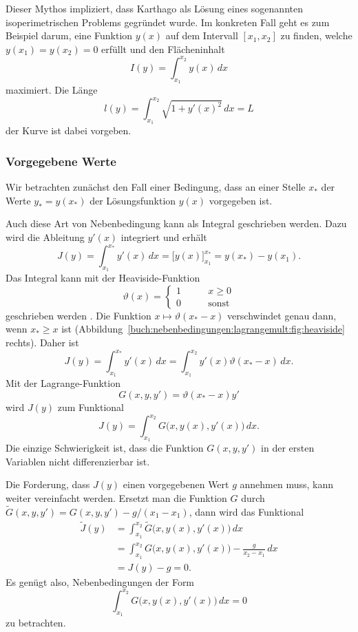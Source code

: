 Dieser Mythos impliziert, dass Karthago als Lösung eines sogenannten
isoperimetrischen Problems gegründet wurde.
%
Im konkreten Fall geht es zum Beispiel darum, eine Funktion $y(x)$
auf dem Intervall $[x_1,x_2]$ zu finden, welche $y(x_1)=y(x_2)=0$
erfüllt und den Flächeninhalt
\[
I(y)
=
\int_{x_1}^{x_2} y(x)\,dx
\]
maximiert.
Die Länge
\[
l(y)
=
\int_{x_1}^{x_2}
\sqrt{1+y'(x)^2}
\,dx
=
L
\]
der Kurve ist dabei vorgeben.

%
%
\subsubsection{Vorgegebene Werte}
Wir betrachten zunächst den Fall einer Bedingung, dass an einer Stelle
$x_*$ der Werte $y_*=y(x_*)$ der Lösungsfunktion $y(x)$ vorgegeben ist.

Auch diese Art von Nebenbedingung kann als Integral geschrieben werden.
Dazu wird die Ableitung $y'(x)$ integriert und erhält
\[
J(y)
=
\int_{x_1}^{x_*} y'(x)\,dx
=
\biggl[y(x)\biggr]_{x_1}^{x_*}
=
y(x_*)-y(x_1).
\]
Das Integral kann mit der Heaviside-Funktion
\begin{equation}
\vartheta(x)
=
\begin{cases}
1&\qquad x\ge 0\\
0&\qquad\text{sonst}
\end{cases}
\label{buch:nebenbedingungen:lagrangemult:eqn:heaviside}
\end{equation}
geschrieben werden%
.
Die Funktion $x\mapsto\vartheta(x_*-x)$ verschwindet genau dann,
wenn $x_*\ge x$ ist
(Abbildung~\ref{buch:nebenbedingungen:lagrangemult:fig:heaviside} rechts).
Daher ist
\[
J(y)
=
\int_{x_1}^{x_*} y'(x)\,dx
=
\int_{x_1}^{x_2} y'(x)\vartheta(x_*-x)\,dx.
\]
Mit der Lagrange-Funktion
\begin{equation}
G(x,y,y')
=
\vartheta(x_*-x)
y'
\label{buch:nebenbedingungen:lagrangemult:eqn:heavilagrange}
\end{equation}
wird $J(y)$ zum Funktional
\[
J(y)
=
\int_{x_1}^{x_2}
G\bigl(x,y(x),y'(x)\bigr)
\,dx.
\]
Die einzige Schwierigkeit ist, dass die Funktion $G(x,y,y')$
in der ersten Variablen nicht differenzierbar ist.

Die Forderung, dass $J(y)$ einen vorgegebenen Wert $g$ annehmen muss,
kann weiter vereinfacht werden.
Ersetzt man die Funktion $G$ durch $\tilde{G}(x,y,y')=G(x,y,y')-g/(x_1-x_1)$,
dann wird das Funktional
\begin{align*}
\tilde{J}(y)
&=
\int_{x_1}^{x_2}
\tilde{G}\bigl(x,y(x),y'(x)\bigr)\,dx
\\
&=
\int_{x_1}^{x_2} G\bigl(x,y(x),y'(x)\bigr) - \frac{g}{x_2-x_1}\,dx
\\
&=
J(y) - g
=
0.
\end{align*}
Es genügt also, Nebenbedingungen der Form
\[
\int_{x_1}^{x_2} G\bigl(x,y(x),y'(x)\bigr)\,dx = 0
\]
zu betrachten.

